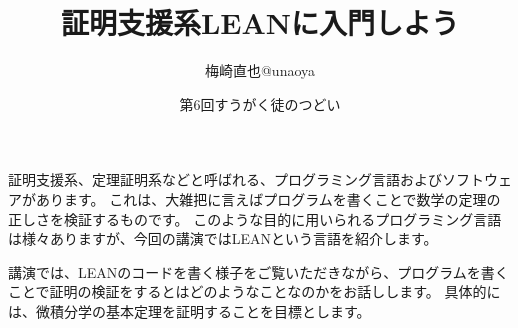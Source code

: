 \documentclass{ltjsarticle}
\title{証明支援系LEANに入門しよう}
\author{梅崎直也@unaoya}
\date{第6回すうがく徒のつどい}
\begin{document}
\maketitle

証明支援系、定理証明系などと呼ばれる、プログラミング言語およびソフトウェアがあります。
これは、大雑把に言えばプログラムを書くことで数学の定理の正しさを検証するものです。
このような目的に用いられるプログラミング言語は様々ありますが、今回の講演ではLEANという言語を紹介します。

講演では、LEANのコードを書く様子をご覧いただきながら、プログラムを書くことで証明の検証をするとはどのようなことなのかをお話しします。
具体的には、微積分学の基本定理を証明することを目標とします。
\end{document}
